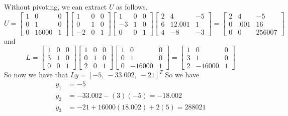 \documentclass{homework}
\begin{document}
\begin{solution}
  Without pivoting, we can extract $U$ as follows.
  \[ U =
    \begin{bmatrix}
      1 & 0 & 0 \\
      0 & 1 & 0 \\
      0 & 16000 & 1
    \end{bmatrix}
    \begin{bmatrix}
      1 & 0 & 0 \\
      0 & 1 & 0 \\
      -2 & 0 & 1
    \end{bmatrix}
    \begin{bmatrix}
      1 & 0 & 0 \\
      -3 & 1 & 0 \\
      0 & 0 & 1
    \end{bmatrix}
    \begin{bmatrix}
      2 & 4 & -5 \\
      6 & 12.001 & 1 \\
      4 & -8 & -3
    \end{bmatrix}
    =
    \begin{bmatrix}
      2 & 4 & -5 \\
      0 & .001 & 16 \\
      0 & 0 & 256007
    \end{bmatrix}
  \]
  and 
  \[
    L = 
    \begin{bmatrix}
      1 & 0 & 0 \\
      3 & 1 & 0 \\
      0 & 0 & 1
    \end{bmatrix}
    \begin{bmatrix}
      1 & 0 & 0 \\
      0 & 1 & 0 \\
      2 & 0 & 1
    \end{bmatrix}
    \begin{bmatrix}
      1 & 0 & 0 \\
      0 & 1 & 0 \\
      0 & -16000 & 1
    \end{bmatrix}
    =
    \begin{bmatrix}
      1 & 0 & 0 \\
      3 & 1 & 0 \\
      2 & -16000 & 1
    \end{bmatrix}
  \]
  So now we have that $Ly = [-5,\ -33.002,\ -21]^T$
  So we have
  \[ 
    \begin{aligned}
      y_1 &= -5 \\
      y_2 &= -33.002 - (3)(-5) = -18.002 \\
      y_3 &= -21 + 16000(18.002) + 2(5) = 288021 
    \end{aligned}
  \]
\end{solution}
\end{document}
